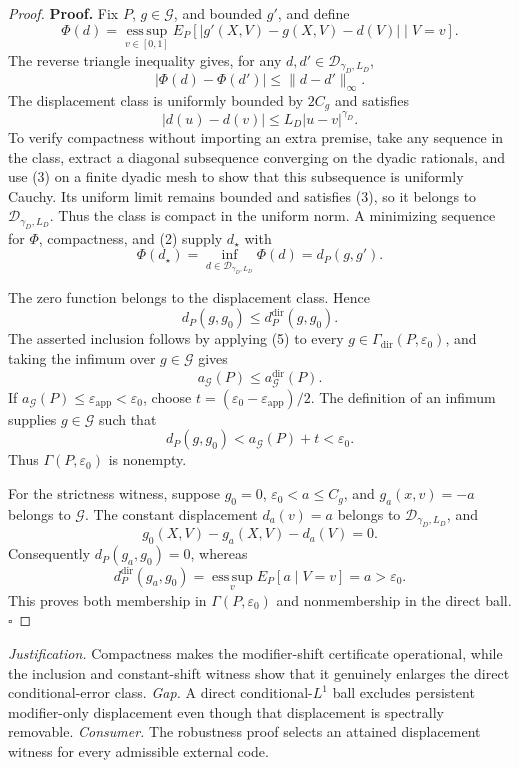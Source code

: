 \documentclass{article}
\begin{document}
\begin{proof}
\textbf{Proof.}
Fix \(P\), \(g\in\mathcal G\), and bounded \(g'\), and define
\[
 \Phi(d)=\operatorname*{ess\,sup}_{v\in[0,1]}
 E_P\!\left[|g'(X,V)-g(X,V)-d(V)|\mid V=v\right]. \tag{1}
\]
The reverse triangle inequality gives, for any \(d,d'\in\mathcal D_{\gamma_D,L_D}\),
\[
 |\Phi(d)-\Phi(d')|\le\|d-d'\|_\infty. \tag{2}
\]
The displacement class is uniformly bounded by \(2C_g\) and satisfies
\[
 |d(u)-d(v)|\le L_D|u-v|^{\gamma_D}. \tag{3}
\]
To verify compactness without importing an extra premise, take any sequence in the class, extract a diagonal subsequence converging on the dyadic rationals, and use (3) on a finite dyadic mesh to show that this subsequence is uniformly Cauchy.  Its uniform limit remains bounded and satisfies (3), so it belongs to \(\mathcal D_{\gamma_D,L_D}\).  Thus the class is compact in the uniform norm.  A minimizing sequence for \(\Phi\), compactness, and (2) supply \(d_\star\) with
\[
 \Phi(d_\star)=\inf_{d\in\mathcal D_{\gamma_D,L_D}}\Phi(d)=d_P(g,g'). \tag{4}
\]

The zero function belongs to the displacement class.  Hence
\[
 d_P(g,g_0)\le d_P^{\mathrm{dir}}(g,g_0). \tag{5}
\]
The asserted inclusion follows by applying (5) to every \(g\in\Gamma_{\mathrm{dir}}(P,\varepsilon_0)\), and taking the infimum over \(g\in\mathcal G\) gives
\[
 a_{\mathcal G}(P)\le a_{\mathcal G}^{\mathrm{dir}}(P). \tag{6}
\]
If \(a_{\mathcal G}(P)\le\varepsilon_{\mathrm{app}}<\varepsilon_0\), choose
\(t=(\varepsilon_0-\varepsilon_{\mathrm{app}})/2\).  The definition of an infimum supplies \(g\in\mathcal G\) such that
\[
 d_P(g,g_0)<a_{\mathcal G}(P)+t<\varepsilon_0. \tag{7}
\]
Thus \(\Gamma(P,\varepsilon_0)\) is nonempty.

For the strictness witness, suppose \(g_0=0\), \(\varepsilon_0<a\le C_g\), and \(g_a(x,v)=-a\) belongs to \(\mathcal G\).  The constant displacement \(d_a(v)=a\) belongs to \(\mathcal D_{\gamma_D,L_D}\), and
\[
 g_0(X,V)-g_a(X,V)-d_a(V)=0.
\]
Consequently \(d_P(g_a,g_0)=0\), whereas
\[
 d_P^{\mathrm{dir}}(g_a,g_0)
 =\operatorname*{ess\,sup}_{v}E_P[a\mid V=v]=a>\varepsilon_0. \tag{8}
\]
This proves both membership in \(\Gamma(P,\varepsilon_0)\) and nonmembership in the direct ball. \(\square\)
\end{proof}
\par\smallskip\noindent \textit{Justification.} Compactness makes the modifier-shift certificate operational, while the inclusion and constant-shift witness show that it genuinely enlarges the direct conditional-error class. \textit{Gap.} A direct conditional-\(L^1\) ball excludes persistent modifier-only displacement even though that displacement is spectrally removable. \textit{Consumer.} The robustness proof selects an attained displacement witness for every admissible external code.
\end{document}
